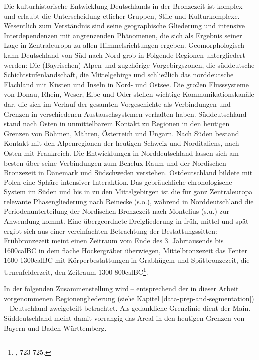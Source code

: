 \documentclass[openany,twoside,twocolumn]{book}
\let\rmarkdownfootnote\footnote%
\def\footnote{\protect\rmarkdownfootnote}
\begin{document}
Die kulturhistorische Entwicklung Deutschlands in der Bronzezeit ist
komplex und erlaubt die Unterscheidung etlicher Gruppen, Stile und
Kulturkomplexe. Wesentlich zum Verständnis sind seine geographische
Gliederung und intensive Interdependenzen mit angrenzenden Phänomenen,
die sich als Ergebnis seiner Lage in Zentraleuropa zu allen
Himmelsrichtungen ergeben. Geomorphologisch kann Deutschland von Süd
nach Nord grob in Folgende Regionen untergliedert werden: Die
(Bayrischen) Alpen und zugehörige Vorgebirgszonen, die süddeutsche
Schichtstufenlandschaft, die Mittelgebirge und schließlich das
norddeutsche Flachland mit Küsten und Inseln in Nord- und Ostsee. Die
großen Flusssysteme von Donau, Rhein, Weser, Elbe und Oder stellen
wichtige Kommunikationskanäle dar, die sich im Verlauf der gesamten
Vorgeschichte als Verbindungen und Grenzen in verschiedenen
Austauschsystemen verhalten haben. Süddeutschland stand nach Osten in
unmittelbarem Kontakt zu Regionen in den heutigen Grenzen von Böhmen,
Mähren, Österreich und Ungarn. Nach Süden bestand Kontakt mit den
Alpenregionen der heutigen Schweiz und Norditaliens, nach Osten mit
Frankreich. Die Entwicklungen in Norddeutschland lassen sich am besten
über seine Verbindungen zum Benelux Raum und der Nordischen Bronzezeit
in Dänemark und Südschweden verstehen. Ostdeutschland bildete mit Polen
eine Sphäre intensiver Interaktion. Das gebräuchliche chronologische
System im Süden und bis in zu den Mittelgebirgen ist die für ganz
Zentraleuropa relevante Phasengliederung nach Reinecke (s.o.), während
in Norddeutschland die Periodenunterteilung der Nordischen Bronzezeit
nach Montelius (s.u.) zur Anwendung kommt. Eine übergeordnete
Dreigliederung in früh, mittel und spät ergibt sich aus einer
vereinfachten Betrachtung der Bestattungssitten: Frühbronzezeit meint
einen Zeitraum vom Ende des 3. Jahrtausends bis 1600calBC in dem flache
Hockergräber überwiegen, Mittelbronzezeit das Fenter 1600-1300calBC mit
Körperbestattungen in Grabhügeln und Spätbronzezeit, die
Urnenfelderzeit, den Zeitraum 1300-800calBC\footnote{\textcite{jockenhovel_germany_2013},
  723-725.}.

In der folgenden Zusammenstellung wird -- entsprechend der in dieser
Arbeit vorgenommenen Regionengliederung (siehe Kapitel
\ref{data-prep-and-segmentation}) -- Deutschland zweigeteilt betrachtet.
Als gedankliche Grenzlinie dient der Main. Süddeutschland meint damit
vorrangig das Areal in den heutigen Grenzen von Bayern und
Baden-Württemberg.
\end{document}
